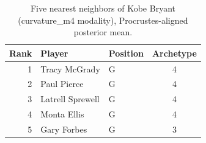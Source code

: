 \begin{table}[htbp]
  \centering\small
  \begin{tabular}{rllc}
    \toprule
    Rank & Player & Position & Archetype \\
    \midrule
    1 & Tracy McGrady & G & 4 \\
    2 & Paul Pierce & G & 4 \\
    3 & Latrell Sprewell & G & 4 \\
    4 & Monta Ellis & G & 4 \\
    5 & Gary Forbes & G & 3 \\
    \bottomrule
  \end{tabular}
  \caption{Five nearest neighbors of Kobe Bryant (curvature_m4 modality), Procrustes-aligned posterior mean.}
  \label{tab:Kobe_Bryant_neighbors_curvature_m4}
\end{table}

